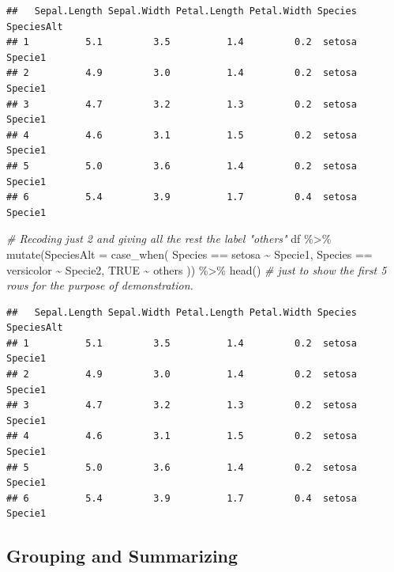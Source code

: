 \documentclass[
]{book}
\newenvironment{Shaded}{\begin{snugshade}}{\end{snugshade}}
\newcommand{\AttributeTok}[1]{\textcolor[rgb]{0.77,0.63,0.00}{#1}}
\newcommand{\CommentTok}[1]{\textcolor[rgb]{0.56,0.35,0.01}{\textit{#1}}}
\newcommand{\ConstantTok}[1]{\textcolor[rgb]{0.00,0.00,0.00}{#1}}
\newcommand{\FunctionTok}[1]{\textcolor[rgb]{0.00,0.00,0.00}{#1}}
\newcommand{\NormalTok}[1]{#1}
\newcommand{\SpecialCharTok}[1]{\textcolor[rgb]{0.00,0.00,0.00}{#1}}
\newcommand{\StringTok}[1]{\textcolor[rgb]{0.31,0.60,0.02}{#1}}
\begin{document}
\begin{verbatim}
##   Sepal.Length Sepal.Width Petal.Length Petal.Width Species SpeciesAlt
## 1          5.1         3.5          1.4         0.2  setosa    Specie1
## 2          4.9         3.0          1.4         0.2  setosa    Specie1
## 3          4.7         3.2          1.3         0.2  setosa    Specie1
## 4          4.6         3.1          1.5         0.2  setosa    Specie1
## 5          5.0         3.6          1.4         0.2  setosa    Specie1
## 6          5.4         3.9          1.7         0.4  setosa    Specie1
\end{verbatim}

\begin{Shaded}
\begin{Highlighting}[]
\CommentTok{\# Recoding just 2 and giving all the rest the label "others"}
\NormalTok{df }\SpecialCharTok{\%\textgreater{}\%} 
  \FunctionTok{mutate}\NormalTok{(}\AttributeTok{SpeciesAlt =} \FunctionTok{case\_when}\NormalTok{(}
\NormalTok{    Species }\SpecialCharTok{==} \StringTok{\textquotesingle{}setosa\textquotesingle{}} \SpecialCharTok{\textasciitilde{}} \StringTok{\textquotesingle{}Specie1\textquotesingle{}}\NormalTok{,}
\NormalTok{    Species }\SpecialCharTok{==} \StringTok{\textquotesingle{}versicolor\textquotesingle{}} \SpecialCharTok{\textasciitilde{}} \StringTok{\textquotesingle{}Specie2\textquotesingle{}}\NormalTok{,}
    \ConstantTok{TRUE} \SpecialCharTok{\textasciitilde{}} \StringTok{\textquotesingle{}others\textquotesingle{}}
\NormalTok{  )) }\SpecialCharTok{\%\textgreater{}\%} 
  \FunctionTok{head}\NormalTok{()  }\CommentTok{\# just to show the first 5 rows for the purpose of demonstration.}
\end{Highlighting}
\end{Shaded}

\begin{verbatim}
##   Sepal.Length Sepal.Width Petal.Length Petal.Width Species SpeciesAlt
## 1          5.1         3.5          1.4         0.2  setosa    Specie1
## 2          4.9         3.0          1.4         0.2  setosa    Specie1
## 3          4.7         3.2          1.3         0.2  setosa    Specie1
## 4          4.6         3.1          1.5         0.2  setosa    Specie1
## 5          5.0         3.6          1.4         0.2  setosa    Specie1
## 6          5.4         3.9          1.7         0.4  setosa    Specie1
\end{verbatim}

\hypertarget{grouping-and-summarizing}{%
\subsection{Grouping and Summarizing}\label{grouping-and-summarizing}}
\end{document}
